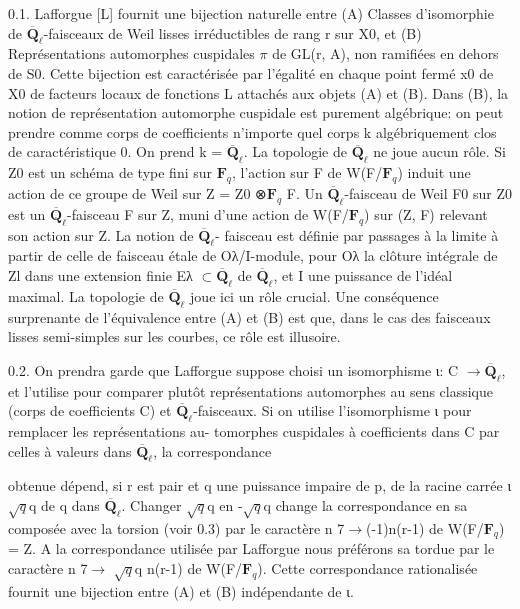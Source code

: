 \documentclass[11pt]{article}
\begin{document}
0.1. Lafforgue [L] fournit une bijection naturelle entre (A) Classes d’isomorphie de \(\overline{\mathbf Q}_\ell\)-faisceaux de Weil lisses irréductibles de rang r sur X0, et (B) Représentations automorphes cuspidales \(\pi\) de GL(r, A), non ramifiées en dehors de S0. Cette bijection est caractérisée par l’égalité en chaque point fermé x0 de X0 de facteurs locaux de fonctions L attachés aux objets (A) et (B). Dans (B), la notion de représentation automorphe cuspidale est purement algébrique: on peut prendre comme corps de coefficients n’importe quel corps k algébriquement clos de caractéristique 0. On prend k = \(\overline{\mathbf Q}_\ell\). La topologie de \(\overline{\mathbf Q}_\ell\) ne joue aucun rôle. Si Z0 est un schéma de type fini sur \(\mathbf F_q\), l’action sur F de W(F/\(\mathbf F_q\)) induit une action de ce groupe de Weil sur Z = Z0 ⊗\(\mathbf F_q\) F. Un \(\overline{\mathbf Q}_\ell\)-faisceau de Weil F0 sur Z0 est un \(\overline{\mathbf Q}_\ell\)-faisceau F sur Z, muni d’une action de W(F/\(\mathbf F_q\)) sur (Z, F) relevant son action sur Z. La notion de \(\overline{\mathbf Q}_\ell\)- faisceau est définie par passages à la limite à partir de celle de faisceau étale de Oλ/I-module, pour Oλ la clôture intégrale de Zl dans une extension finie Eλ \(\subset\)\(\overline{\mathbf Q}_\ell\) de \(\overline{\mathbf Q}_\ell\), et I une puissance de l’idéal maximal. La topologie de \(\overline{\mathbf Q}_\ell\) joue ici un rôle crucial. Une conséquence surprenante de l’équivalence entre (A) et (B) est que, dans le cas des faisceaux lisses semi-simples sur les courbes, ce rôle est illusoire. 

0.2. On prendra garde que Lafforgue suppose choisi un isomorphisme ι: C \(\to\)\(\overline{\mathbf Q}_\ell\), et l’utilise pour comparer plutôt représentations automorphes au sens classique (corps de coefficients C) et \(\overline{\mathbf Q}_\ell\)-faisceaux. Si on utilise l’isomorphisme ι pour remplacer les représentations au- tomorphes cuspidales à coefficients dans C par celles à valeurs dans \(\overline{\mathbf Q}_\ell\), la correspondance

obtenue dépend, si r est pair et q une puissance impaire de p, de la racine carrée ι \(\sqrt{q}\)q  de q dans \(\overline{\mathbf Q}_\ell\). Changer \(\sqrt{q}\)q en -\(\sqrt{q}\)q change la correspondance en sa composée avec la torsion (voir 0.3) par le caractère n 7\(\to\)(-1)n(r-1) de W(F/\(\mathbf F_q\)) = Z. A la correspondance utilisée par Lafforgue nous préférons sa tordue par le caractère n 7\(\to\) \(\sqrt{q}\)q n(r-1) de W(F/\(\mathbf F_q\)). Cette correspondance rationalisée fournit une bijection entre (A) et (B) indépendante de ι. 
\end{document}
